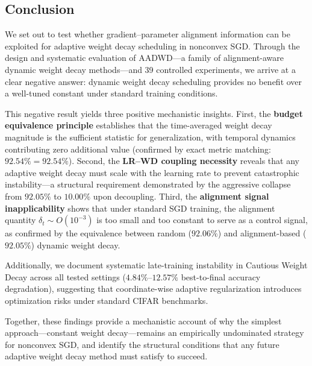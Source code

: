 \documentclass{article}
\begin{document}
\subsection{Conclusion}

We set out to test whether gradient--parameter alignment information can be exploited
for adaptive weight decay scheduling in nonconvex SGD.
Through the design and systematic evaluation of AADWD---a family of alignment-aware
dynamic weight decay methods---and 39 controlled experiments, we arrive at a clear
negative answer: dynamic weight decay scheduling provides no benefit over a
well-tuned constant under standard training conditions.

This negative result yields three positive mechanistic insights.
First, the \textbf{budget equivalence principle} establishes that the time-averaged
weight decay magnitude is the sufficient statistic for generalization, with temporal
dynamics contributing zero additional value (confirmed by exact metric matching:
$92.54\% = 92.54\%$).
Second, the \textbf{LR--WD coupling necessity} reveals that any adaptive weight decay
must scale with the learning rate to prevent catastrophic instability---a structural
requirement demonstrated by the aggressive collapse from $92.05\%$ to $10.00\%$ upon
decoupling.
Third, the \textbf{alignment signal inapplicability} shows that under standard SGD
training, the alignment quantity $\delta_t \sim O(10^{-3})$ is too small and too
constant to serve as a control signal, as confirmed by the equivalence between random
($92.06\%$) and alignment-based ($92.05\%$) dynamic weight decay.

Additionally, we document systematic late-training instability in Cautious Weight
Decay \citep{liu2025cautious} across all tested settings
($4.84\%$--$12.57\%$ best-to-final accuracy degradation), suggesting that
coordinate-wise adaptive regularization introduces optimization risks under standard
CIFAR benchmarks.

Together, these findings provide a mechanistic account of why the simplest
approach---constant weight decay---remains an empirically undominated strategy for
nonconvex SGD, and identify the structural conditions that any future adaptive weight
decay method must satisfy to succeed.



\end{document}
